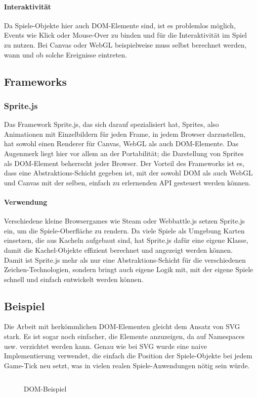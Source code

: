 \documentclass[a4paper, 12pt]{article}
\begin{document}
\paragraph{Interaktivität} Da Spiele-Objekte hier auch DOM-Elemente sind, ist es problemlos möglich, Events wie Klick oder Mouse-Over zu binden und für die Interaktivität im Spiel zu nutzen. Bei Canvas oder WebGL beispielweise muss selbst berechnet werden, wann und ob solche Ereignisse eintreten.
\subsection{Frameworks}
\subsubsection{Sprite.js}
Das Framework  Sprite.js, das sich darauf spezialisiert hat, Sprites, also Animationen mit Einzelbildern für jeden Frame, in jedem Browser darzustellen, hat sowohl einen Renderer für Canvas, WebGL als auch DOM-Elemente. Das Augenmerk liegt hier vor allem an der Portabilität; die Darstellung von Sprites als DOM-Element beherrscht jeder Browser. Der Vorteil des Frameworks ist es, dass eine Abstraktions-Schicht gegeben ist, mit der sowohl DOM als auch WebGL und Canvas mit der selben, einfach zu erlernenden API gesteuert werden können.
\paragraph{Verwendung} Verschiedene kleine Browsergames wie Steam oder Webbattle.js setzen Sprite.js ein, um die Spiele-Oberfläche zu rendern. Da viele Spiele als Umgebung Karten einsetzen, die aus Kacheln aufgebaut sind, hat Sprite.js dafür eine eigene Klasse, damit die Kachel-Objekte effizient berechnet und angezeigt werden können. Damit ist Sprite.js mehr als nur eine Abstraktions-Schicht für die verschiedenen Zeichen-Technologien, sondern bringt auch eigene Logik mit, mit der eigene Spiele schnell und einfach entwickelt werden können.
\subsection{Beispiel}
Die Arbeit mit herkömmlichen DOM-Elementen gleicht dem Ansatz von SVG stark. Es ist sogar noch einfacher, die Elemente anzuzeigen, da auf Namespaces usw. verzichtet werden kann. Genau wie bei SVG wurde eine naive Implementierung verwendet, die einfach die Position der Spiele-Objekte bei jedem Game-Tick neu setzt, was in vielen realen Spiele-Anwendungen nötig sein würde.
\begin{figure}[H]
	\inputminted{javascript}{assets/vanilladom_example.js}
	\caption{DOM-Beispiel}
	\label{dom_example}
\end{figure}
\end{document}
